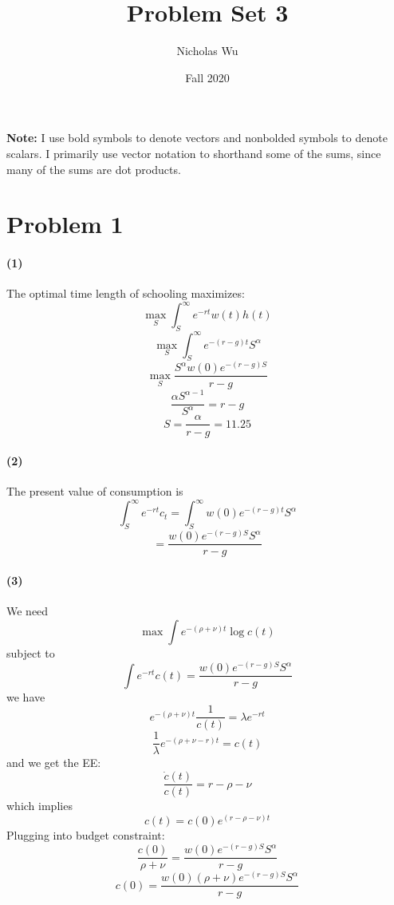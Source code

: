\documentclass[10pt,letter]{article}
\newcommand{\problem}[1]{\section*{Problem #1}}
\newcommand{\problempart}[1]{\paragraph{#1}}
\begin{document}


\title{Problem Set 3}

\author{Nicholas Wu}

\date{Fall 2020}

\maketitle
\textbf{Note:} I use bold symbols to denote vectors and nonbolded symbols to denote scalars. I primarily use vector notation to shorthand some of the sums, since many of the sums are dot products.

\problem{1}

\problempart{(1)}
The optimal time length of schooling maximizes:
\[ \max_S \int_S^\infty e^{-rt}w(t)h(t) \]
\[ \max_S \int_S^\infty e^{-(r - g)t}S^{\alpha} \]
\[ \max_S \frac{S^{\alpha}w(0)e^{-(r-g)S}}{r-g} \]
\[ \frac{\alpha S^{\alpha - 1}}{S^\alpha} = r-g\]
\[  S = \frac{\alpha}{r-g} = 11.25\]
\problempart{(2)}
The present value of consumption is
\[ \int_S^\infty e^{-rt}c_t = \int_S^\infty w(0) e^{-(r-g)t}S^\alpha \]
\[  = \frac{w(0) e^{-(r-g)S}S^\alpha }{r-g}\]
\problempart{(3)}
We need
\[ \max  \int e^{-(\rho + \nu)t} \log c(t) \]
subject to
\[ \int e^{- rt}c(t) = \frac{w(0) e^{-(r-g)S}S^\alpha }{r-g} \]
we have
\[ e^{-(\rho + \nu)t} \frac{1}{c(t)} = \lambda e^{-rt}\]
\[ \frac{1}{\lambda }e^{-(\rho + \nu - r)t}  = c(t) \]
and we get the EE:
\[ \frac{\dot{c}(t)}{c(t)}= r - \rho - \nu  \]
which implies
\[ c(t) = c(0) e^{(r-\rho-\nu)t} \]
Plugging into budget constraint:
\[ \frac{c(0)}{\rho+\nu} = \frac{w(0) e^{-(r-g)S}S^\alpha }{r-g} \]
\[ c(0) = \frac{w(0)(\rho+\nu) e^{-(r-g)S}S^\alpha }{r-g} \]
\end{document}
